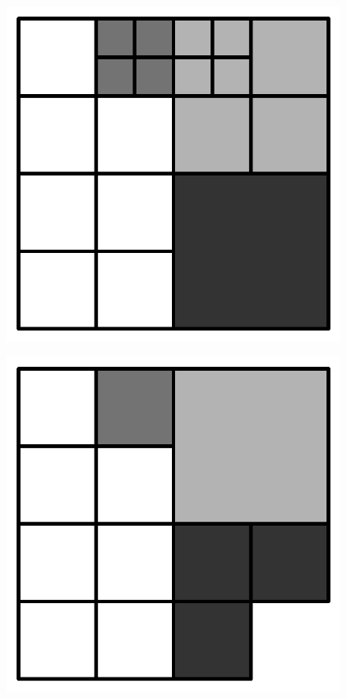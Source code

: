 \begin{figure}[hb!]
  \centering
  \begin{minipage}[b]{0.2\linewidth}
    \includegraphics[width=\linewidth]{images/Fig8a}
    \subcaption{}
    \label{fig:Fig8a}
  \end{minipage}
  \begin{minipage}[b]{0.2\linewidth}
    \includegraphics[width=\linewidth]{images/Fig8b}

\end{minipage}
\end{figure}
